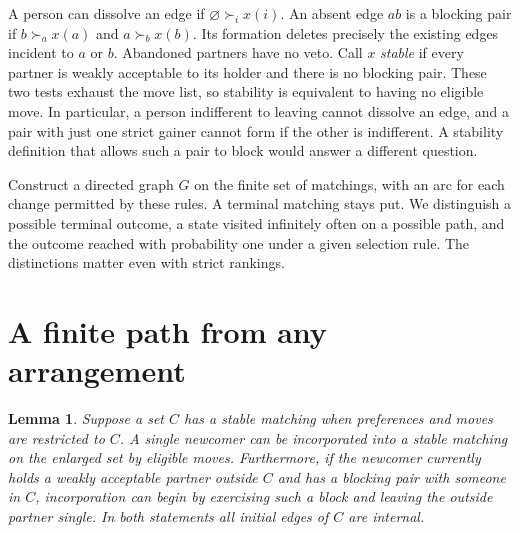 \documentclass[11pt]{article}
\newtheorem{lemma}{Lemma}
\newcommand{\alone}{\varnothing}
\begin{document}
A person can dissolve an edge if \(\alone\succ_i x(i)\). An absent edge \(ab\) is a blocking pair if \(b\succ_a x(a)\) and \(a\succ_b x(b)\). Its formation deletes precisely the existing edges incident to \(a\) or \(b\). Abandoned partners have no veto. Call \(x\) \emph{stable} if every partner is weakly acceptable to its holder and there is no blocking pair. These two tests exhaust the move list, so stability is equivalent to having no eligible move. In particular, a person indifferent to leaving cannot dissolve an edge, and a pair with just one strict gainer cannot form if the other is indifferent. A stability definition that allows such a pair to block would answer a different question.

Construct a directed graph \(G\) on the finite set of matchings, with an arc for each change permitted by these rules. A terminal matching stays put. We distinguish a possible terminal outcome, a state visited infinitely often on a possible path, and the outcome reached with probability one under a given selection rule. The distinctions matter even with strict rankings.

\section{A finite path from any arrangement}\label{sec:path}

\begin{lemma}\label{lem:insert}
Suppose a set \(C\) has a stable matching when preferences and moves are restricted to \(C\). A single newcomer can be incorporated into a stable matching on the enlarged set by eligible moves. Furthermore, if the newcomer currently holds a weakly acceptable partner outside \(C\) and has a blocking pair with someone in \(C\), incorporation can begin by exercising such a block and leaving the outside partner single. In both statements all initial edges of \(C\) are internal.
\end{lemma}
\end{document}
